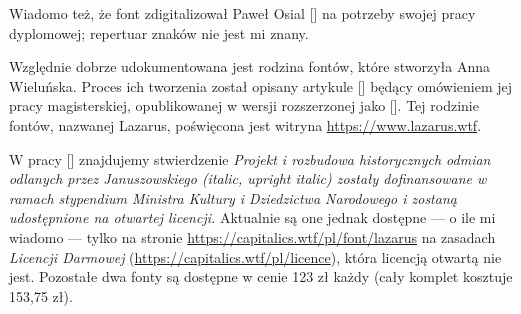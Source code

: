 
Wiadomo też, że font zdigitalizował Paweł Osial
[\cite[39]{anna_wielunska_digitalizacja_2018}] na potrzeby swojej
pracy dyplomowej; repertuar znaków nie jest mi znany.


Względnie dobrze udokumentowana jest rodzina fontów, które stworzyła
Anna Wieluńska. Proces ich tworzenia został opisany artykule
[\cite{anna_wielunska_digitalizacja_2018}] będący omówieniem jej pracy
magisterskiej, opublikowanej w wersji rozszerzonej jako
[\cite{wielunska_anna_lazarus:_2018}].  Tej rodzinie fontów, nazwanej
Lazarus, poświęcona jest witryna \url{https://www.lazarus.wtf}.


W pracy [\cite[52]{wielunska_anna_lazarus:_2018}] znajdujemy stwierdzenie
  \textit{Projekt i rozbudowa historycznych odmian odlanych przez
  Januszowskiego (\textit{italic}, \textit{upright italic}) zostały
  dofinansowane w ramach stypendium Ministra Kultury i Dziedzictwa
  Narodowego i zostaną udostępnione na otwartej licencji.}
Aktualnie są one jednak dostępne --- o ile mi wiadomo --- tylko na
stronie \url{https://capitalics.wtf/pl/font/lazarus} na zasadach
\textit{Licencji Darmowej} (\url{https://capitalics.wtf/pl/licence}),
która licencją otwartą nie jest. Pozostałe dwa fonty są dostępne w
cenie 123 zł każdy (cały komplet kosztuje 153,75 zł).

